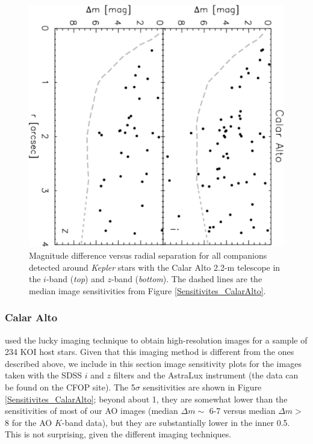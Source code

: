 \documentclass[twocolumn,appendixfloats]{aastex6}
\begin{document}
\begin{figure}[!t]
\centering
\includegraphics[angle=90, scale=0.48]{CalarAlto_multiples.pdf}
\caption{Magnitude difference versus radial separation for all companions detected
around {\it Kepler} stars with the Calar Alto 2.2-m telescope in the $i$-band ({\it top}) 
and $z$-band ({\it bottom}). The dashed lines are the median image sensitivities from 
Figure \ref {Sensitivites_CalarAlto}. 
\label{KOIs_CalarAlto}}
\end{figure}

\subsubsection{Calar Alto}

\citet{lillo-box12,lillo-box14} used the lucky imaging technique to obtain 
high-resolution images for a sample of 234 KOI host stars. Given that 
this imaging method is different from the ones described above, we 
include in this section image sensitivity plots for the images taken with
the SDSS $i$ and $z$ filters and the AstraLux instrument (the data can 
be found on the CFOP site). 
The 5$\sigma$ sensitivities are shown in Figure \ref{Sensitivites_CalarAlto}; 
beyond about 1\arcsec, they are somewhat  lower than the sensitivities of 
most of our AO images (median $\Delta m \sim$ 6-7 versus median
$\Delta m >$ 8 for the AO $K$-band data), but they are substantially lower in the 
inner 0.5\arcsec. This is not surprising, given the different imaging techniques.
\end{document}
